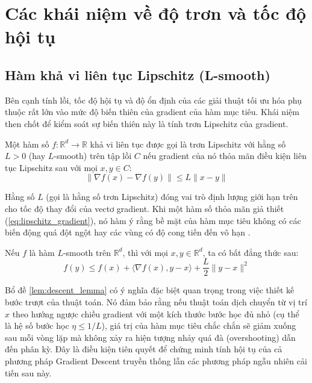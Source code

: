 \section{Các khái niệm về độ trơn và tốc độ hội tụ}

\subsection{Hàm khả vi liên tục Lipschitz (L-smooth)}

Bên cạnh tính lồi, tốc độ hội tụ và độ ổn định của các giải thuật tối ưu hóa phụ thuộc rất lớn vào mức độ biến thiên của gradient của hàm mục tiêu. Khái niệm then chốt để kiểm soát sự biến thiên này là tính trơn Lipschitz của gradient.

\begin{definition}
\label{def:l_smooth}
Một hàm số $f: \mathbb{R}^d \to \mathbb{R}$ khả vi liên tục được gọi là trơn Lipschitz với hằng số $L > 0$ (hay $L$-smooth) trên tập lồi $C$ nếu gradient của nó thỏa mãn điều kiện liên tục Lipschitz sau với mọi $x, y \in C$:
\begin{equation}\label{eq:lipschitz_gradient}
\|\nabla f(x) - \nabla f(y)\| \le L \|x - y\|
\end{equation}
\end{definition}

Hằng số $L$ (gọi là hằng số trơn Lipschitz) đóng vai trò định lượng giới hạn trên cho tốc độ thay đổi của vectơ gradient. Khi một hàm số thỏa mãn giả thiết (\ref{eq:lipschitz_gradient}), nó hàm ý rằng bề mặt của hàm mục tiêu không có các biến động quá đột ngột hay các vùng có độ cong tiến đến vô hạn \cite{schmidt2017minimizing}.

\begin{lemma}[Bổ đề Descent]
\label{lem:descent_lemma}
Nếu $f$ là hàm $L$-smooth trên $\mathbb{R}^d$, thì với mọi $x, y \in \mathbb{R}^d$, ta có bất đẳng thức sau:
\begin{equation}\label{eq:descent_lemma}
f(y) \le f(x) + \langle \nabla f(x), y - x \rangle + \frac{L}{2}\|y - x\|^2
\end{equation}
\end{lemma}

Bổ đề \ref{lem:descent_lemma} có ý nghĩa đặc biệt quan trọng trong việc thiết kế bước trượt của thuật toán. Nó đảm bảo rằng nếu thuật toán dịch chuyển từ vị trí $x$ theo hướng ngược chiều gradient với một kích thước bước học đủ nhỏ (cụ thể là hệ số bước học $\eta \le 1/L$), giá trị của hàm mục tiêu chắc chắn sẽ giảm xuống sau mỗi vòng lặp mà không xảy ra hiện tượng nhảy quá đà (overshooting) dẫn đến phân kỳ. Đây là điều kiện tiên quyết để chứng minh tính hội tụ của cả phương pháp Gradient Descent truyền thống lẫn các phương pháp ngẫu nhiên cải tiến sau này.


